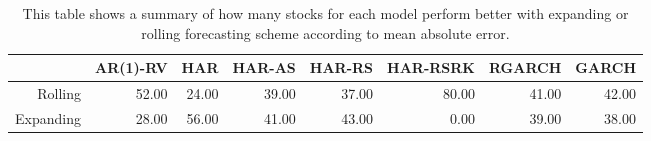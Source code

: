 \begin{table}[ht]
\centering
\begin{tabular}{rrrrrrrr}
  \hline
 & AR(1)-RV & HAR & HAR-AS & HAR-RS & HAR-RSRK & RGARCH & GARCH \\ 
  \hline
Rolling & 52.00 & 24.00 & 39.00 & 37.00 & 80.00 & 41.00 & 42.00 \\ 
  Expanding & 28.00 & 56.00 & 41.00 & 43.00 & 0.00 & 39.00 & 38.00 \\ 
   \hline
\end{tabular}
\caption[Better scheme MAE summary]{This table shows a summary of how many stocks for each model perform better with expanding or rolling forecasting scheme according to mean absolute error. } 
\label{Table:Better_MAE_summary}
\end{table}
